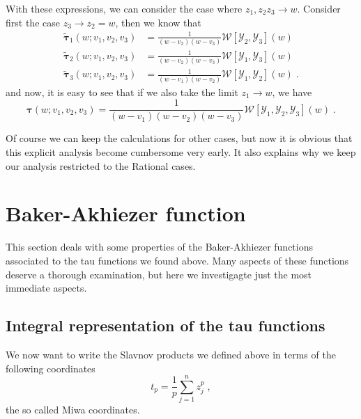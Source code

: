 \documentclass[a4paper,12pt]{amsart}
\begin{document}
With these expressions, we can consider the case where \(z_1, z_2 z_3
\to w\). Consider first the case \(z_3 \to z_2 = w\), then  
we know that 
\begin{equation}
  \begin{split}
  \tilde{\bm{\tau}}_1(w; v_1 , v_2, v_3) & = \frac{1}{(w - v_2)(w - v_3)}\mathcal{W}[\mathcal{Y}_2, \mathcal{Y}_3](w)\\
  \tilde{\bm{\tau}}_2(w; v_1 , v_2, v_3) & = \frac{1}{(w - v_2)(w - v_3)}\mathcal{W}[\mathcal{Y}_1, \mathcal{Y}_3](w)\\
  \tilde{\bm{\tau}}_3(w; v_1 , v_2, v_3) & = \frac{1}{(w - v_1)(w - v_2)}\mathcal{W}[\mathcal{Y}_1, \mathcal{Y}_2](w)
  \; .
  \end{split}
\end{equation}
and now, it is easy to see that if we also take the limit \(z_1\to w\), we have
\begin{equation}
  \bm{\tau}(w; v_1 , v_2, v_3) = 
  \frac{1}{(w - v_1)(w - v_2)(w - v_3)} \mathcal{W}[\mathcal{Y}_1, \mathcal{Y}_2, \mathcal{Y}_3](w)\; .
\end{equation}

Of course we can keep the calculations for other cases, but now it is obvious that
this explicit analysis become cumbersome very early. It also explains why we
keep our analysis restricted to the Rational cases. 

\section{Baker-Akhiezer function}

This section deals with some properties of the Baker-Akhiezer
functions associated to the tau functions we found above.  Many
aspects of these functions deserve a thorough examination, but here we
investigagte just the most immediate aspects.

\subsection{Integral representation of the tau functions}

We now want to write the Slavnov products we defined above in terms of
the following coordinates
\begin{equation}
  t_p = \frac{1}{p}\sum_{j=1}^n z_j^p\; ,
\end{equation}
the so called Miwa coordinates.
\end{document}
